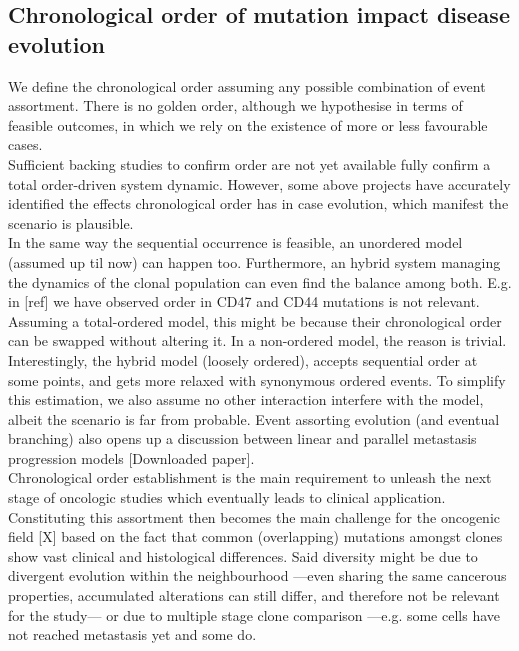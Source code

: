 \subsection{Chronological order of mutation impact disease evolution}
We define the chronological order assuming any possible combination of event assortment. There is no golden order, although we hypothesise in terms of feasible outcomes, in which we rely on the existence of more or less favourable cases.
\\

Sufficient backing studies to confirm order are not yet available fully confirm a total order-driven system dynamic. However, some above projects have accurately identified the effects chronological order has in case evolution, which manifest the scenario is plausible. 
\\

In the same way the sequential occurrence is feasible, an unordered model (assumed up til now) can happen too. Furthermore, an hybrid system managing the dynamics of the clonal population can even find the balance among both. E.g. in [ref] we have observed order in CD47 and CD44 mutations is not relevant. Assuming a total-ordered model, this might be because their chronological order can be swapped without altering it. In a non-ordered model, the reason is trivial. Interestingly, the hybrid model (loosely ordered), accepts sequential order at some points, and gets more relaxed with synonymous ordered events. To simplify this estimation, we also assume no other interaction interfere with the model, albeit the scenario is far from probable. Event assorting evolution (and eventual branching) also opens up a discussion between linear and parallel metastasis progression models [Downloaded paper].
\\

Chronological order establishment is the main requirement to unleash the next stage  of oncologic studies which eventually leads to clinical application. Constituting this assortment then becomes the main challenge for the oncogenic field [X] based on the fact that common (overlapping) mutations amongst clones show vast clinical and histological differences. Said diversity might be due to divergent evolution within the neighbourhood —even sharing the same cancerous properties, accumulated alterations can still differ, and therefore not be relevant for the study— or due to multiple stage clone comparison —e.g. some cells have not reached metastasis yet and some do.
\\

